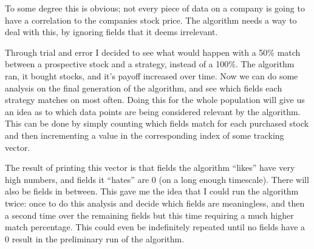 To some degree this is obvious; not every piece of data on a company is going to have a correlation to the companies stock price. The algorithm needs a way to deal with this, by ignoring fields that it deems irrelevant. \newline

Through trial and error I decided to see what would happen with a 50\% match between a prospective stock and a strategy, instead of a 100\%. The algorithm ran, it bought stocks, and it's payoff increased over time. Now we can do some analysis on the final generation of the algorithm, and see which fields each strategy matches on most often. Doing this for the whole population will give us an idea as to which data points are being considered relevant by the algorithm. This can be done by simply counting which fields match for each purchased stock and then incrementing a value in the corresponding index of some tracking vector. \newline

The result of printing this vector is that fields the algorithm ``likes'' have very high numbers, and fields it ``hates'' are 0 (on a long enough timescale). There will also be fields in between. This gave me the idea that I could run the algorithm twice: once to do this analysis and decide which fields are meaningless, and then a second time over the remaining fields but this time requiring a much higher match percentage. This could even be indefinitely repeated until no fields have a 0 result in the preliminary run of the algorithm. \newline
